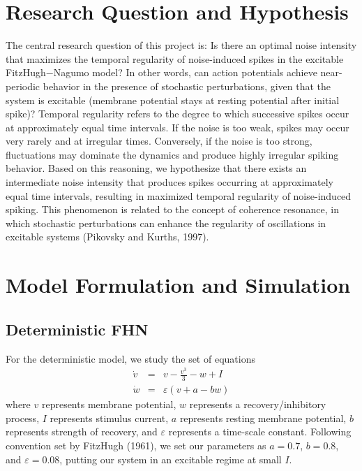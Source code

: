 \documentclass{article}
\begin{document}
\section{Research Question and Hypothesis}
The central research question of this project is: Is there an optimal noise intensity that maximizes the temporal regularity of noise-induced spikes in the excitable FitzHugh$-$Nagumo model? In other words, can action potentials achieve near-periodic behavior in the presence of stochastic perturbations, given that the system is excitable (membrane potential stays at resting potential after initial spike)? Temporal regularity refers to the degree to which successive spikes occur at approximately equal time intervals. If the noise is too weak, spikes may occur very rarely and at irregular times. Conversely, if the noise is too strong, fluctuations may dominate the dynamics and produce highly irregular spiking behavior. Based on this reasoning, we hypothesize that there exists an intermediate noise intensity that produces spikes occurring at approximately equal time intervals, resulting in maximized temporal regularity of noise-induced spiking. This phenomenon is related to the concept of coherence resonance, in which stochastic perturbations can enhance the regularity of oscillations in excitable systems (Pikovsky and Kurths, 1997).

\section{Model Formulation and Simulation}
\subsection{Deterministic FHN}
For the deterministic model, we study the set of equations
\begin{eqnarray}
    \dot{v}&=&v-\frac{v^3}{3}-w+I \\
    \dot{w}&=&\varepsilon(v+a-bw)
\end{eqnarray}
where $v$ represents membrane potential, $w$ represents a recovery/inhibitory process, $I$ represents stimulus current, $a$ represents resting membrane potential, $b$ represents strength of recovery, and $\varepsilon$ represents a time-scale constant. Following convention set by FitzHugh (1961), we set our parameters as $a=0.7$, $b=0.8$, and $\varepsilon=0.08$, putting our system in an excitable regime at small $I$. \cite{fitzhugh1961}
\end{document}
